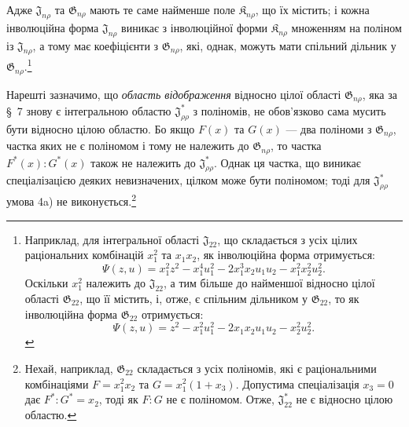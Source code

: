 \documentclass[11pt]{article}
\providecommand{\Kfield}{\mathfrak{K}}
\providecommand{\Jdom}{\mathfrak{J}}
\providecommand{\Gdom}{\mathfrak{G}}
\begin{document}
Адже $\Jdom_{n\rho}$ та $\Gdom_{n\rho}$ мають те саме найменше поле $\Kfield_{n\rho}$, що їх містить; і кожна інволюційна форма $\Jdom_{n\rho}$ виникає з інволюційної форми $\Kfield_{n\rho}$ множенням на поліном із $\Jdom_{n\rho}$, а тому має коефіцієнти з $\Gdom_{n\rho}$, які, однак, можуть мати спільний дільник у $\Gdom_{n\rho}$.\footnote{Наприклад, для інтегральної області $\Jdom_{22}$, що складається з усіх цілих раціональних комбінацій $x_1^2$ та $x_1x_2$, як інволюційна форма отримується:
\[
\Psi(z,u)=x_1^2z^2-x_1^4u_1^2-2x_1^3x_2u_1u_2-x_1^2x_2^2u_2^2.
\]
Оскільки $x_1^2$ належить до $\Jdom_{22}$, а тим більше до найменшої відносно цілої області $\Gdom_{22}$, що її містить, і, отже, є спільним дільником у $\Gdom_{22}$, то як інволюційна форма $\Gdom_{22}$ отримується:
\[
\Psi(z,u)=z^2-x_1^2u_1^2-2x_1x_2u_1u_2-x_2^2u_2^2.
\]}

Нарешті зазначимо, що \emph{область відображення} відносно цілої області $\Gdom_{n\rho}$, яка за \S\ 7 знову є інтегральною областю $\Jdom^*_{\rho\rho}$ з поліномів, не обов'язково сама мусить бути відносно цілою областю. Бо якщо $F(x)$ та $G(x)$ --- два поліноми з $\Gdom_{n\rho}$, частка яких не є поліномом і тому не належить до $\Gdom_{n\rho}$, то частка $F^*(x):G^*(x)$ також не належить до $\Jdom^*_{\rho\rho}$. Однак ця частка, що виникає спеціалізацією деяких невизначених, цілком може бути поліномом; тоді для $\Jdom^*_{\rho\rho}$ умова 4a) не виконується.\footnote{Нехай, наприклад, $\Gdom_{22}$ складається з усіх поліномів, які є раціональними комбінаціями $F=x_1^2x_2$ та $G=x_1^2(1+x_3)$. Допустима спеціалізація $x_3=0$ дає $F^*:G^*=x_2$, тоді як $F:G$ не є поліномом. Отже, $\Jdom^*_{22}$ не є відносно цілою областю.}
\end{document}

